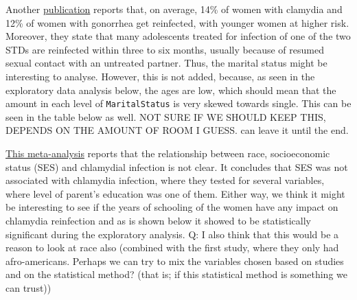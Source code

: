 \documentclass[
]{article}
\begin{document}
Another \href{https://policylab.chop.edu/sites/default/files/pdf/publications/Preventing_Chlamydia_Gonorrhea_Reinfection_through_Increased_Use_of_EPT.pdf}{publication} reports that, on average, 14\% of women with clamydia and 12\% of women with gonorrhea get reinfected, with younger women at higher risk. Moreover, they state that many adolescents treated for infection of one of the two STDs are reinfected within three to six months, usually because of resumed sexual contact with an untreated partner. Thus, the marital status might be interesting to analyse. However, this is not added, because, as seen in the exploratory data analysis below, the ages are low, which should mean that the amount in each level of \texttt{MaritalStatus} is very skewed towards single. This can be seen in the table below as well. NOT SURE IF WE SHOULD KEEP THIS, DEPENDS ON THE AMOUNT OF ROOM I GUESS. can leave it until the end.

\href{https://www.ncbi.nlm.nih.gov/pmc/articles/PMC2094865/}{This meta-analysis} reports that the relationship between race, socioeconomic status (SES) and chlamydial infection is not clear. It concludes that SES was not associated with chlamydia infection, where they tested for several variables, where level of parent's education was one of them. Either way, we think it might be interesting to see if the years of schooling of the women have any impact on chlamydia reinfection and as is shown below it showed to be statistically significant during the exploratory analysis. Q: I also think that this would be a reason to look at race also (combined with the first study, where they only had afro-americans. Perhaps we can try to mix the variables chosen based on studies and on the statistical method? (that is; if this statistical method is something we can trust))
\end{document}
